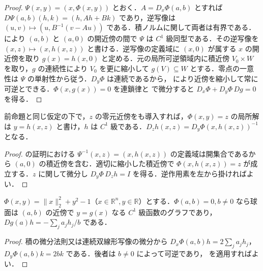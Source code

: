 \begin{proof}
$\Psi(x,y)=(x,\Phi(x,y))$ とおく．$A=D_x\Phi(a,b)$ とすれば $D\Psi(a,b)(h,k)=(h,Ah+Bk)$ であり，逆写像は $(u,v)\mapsto(u,B^{-1}(v-Au))$ である．積ノルムに関して両者は有界である． により $(a,b)$ と $(a,0)$ の開近傍の間で $\Psi$ は $C^1$ 級同型である．その逆写像を $(x,z)\mapsto(x,h(x,z))$ と書ける．逆写像の定義域に $(x,0)$ が属する $x$ の開近傍を取り $g(x)=h(x,0)$ と定める．元の局所可逆領域内に積近傍 $V_0\times W$ を取り，$g$ の連続性により $V_0$ を更に縮小して $g(V)\subseteq W$ とする．零点の一意性は $\Psi$ の単射性から従う．$D_y\Phi$ は連続であるから， により近傍を縮小して常に可逆とできる．$\Phi(x,g(x))=0$ を連鎖律と  で微分すると $D_x\Phi+D_y\Phi\,Dg=0$ を得る．
\end{proof}
\begin{prop}[方程式の右辺への依存]
前命題と同じ仮定の下で，$z$ の零元近傍をも導入すれば，$\Phi(x,y)=z$ の局所解は $y=h(x,z)$ と書け，$h$ は $C^1$ 級である．$D_zh(x,z)=D_y\Phi(x,h(x,z))^{-1}$ となる．
\end{prop}
\begin{proof}
 の証明における $\Psi^{-1}(x,z)=(x,h(x,z))$ の定義域は開集合であるから $(a,0)$ の積近傍を含む．適切に縮小した積近傍で $\Phi(x,h(x,z))=z$ が成立する．$z$ に関して微分し $D_y\Phi\,D_zh=I$ を得る．逆作用素を左から掛ければよい．
\end{proof}
\begin{example}[単位球面の局所的表示]
$\Phi(x,y)=\|x\|_2^2+y^2-1$（$x\in\mathbb R^n,y\in\mathbb R$）とする．$\Phi(a,b)=0,b\ne0$ なら球面は $(a,b)$ の近傍で $y=g(x)$ なる $C^1$ 級函数のグラフであり，$Dg(a)h=-\sum_j a_jh_j/b$ である．
\end{example}
\begin{proof}
積の微分法則又は連続双線形写像の微分から $D_x\Phi(a,b)h=2\sum_j a_jh_j$，$D_y\Phi(a,b)k=2bk$ である．後者は $b\ne0$ によって可逆であり， を適用すればよい．
\end{proof}
